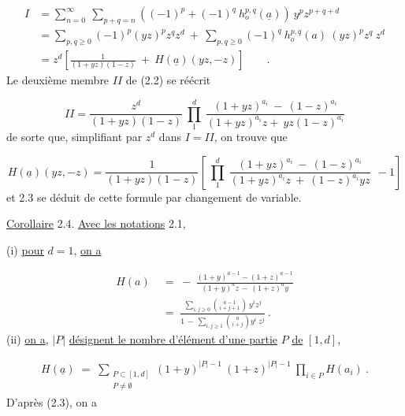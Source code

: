 \begin{equation*}
\begin{aligned}
I &= \sum_{n=0}^{\infty}\ \sum_{p+q=n} ((-1)^p+(-1)^q\ h_o^{p,q}(\underline{a}))\ y^p z^{p+q+d}\\
&= \sum_{p,q\geq 0} (-1)^p(yz)^p z^q z^d\ +\ \sum_{p,q\geq 0} (-1)^q\ h_o^{p,q}(a)\ (yz)^p z^q\ z^d\\
&= z^d\left[\frac{1}{(1+yz)(1-z)}\ +\ H(\underline{a})(yz,-z)\right] \qquad .
\end{aligned}
\end{equation*}
Le deuxième membre $II$ de (2.2) se réécrit

\begin{equation*}
II = \frac{z^d}{(1+yz)(1-z)}\ \prod_{1}^{d}\ \frac{(1+yz)^{a_i}\ -\ (1-z)^{a_i}}{(1+yz)^{a_i}z+\ yz(1-z)^{a_i}}
\end{equation*}
de sorte que, simplifiant par $z^d$ dans $I = II$, on trouve que

\begin{equation*}
H(\underline{a})(yz,-z) = \frac{1}{(1+yz)(1-z)}\left[\ \prod_{1}^{d}\ \frac{(1+yz)^{a_i}\ -\ (1-z)^{a_i}}{(1+yz)^{a_i}z\ +\ (1-z)^{a_i}yz}\ \ -1\right]
\end{equation*}
et 2.3 se déduit de cette formule par changement de variable.



\underline{Corollaire} 2.4. \underline{Avec les notations} 2.1,

(i) \quad \underline{pour} $d = 1$, \underline{on a}

\begin{equation*}
\begin{aligned}
H(a) \;&=\; -\ \frac{(1+y)^{a-1} - (1+z)^{a-1}}{(1+y)^{a}z \,-\, (1+z)^{a}y}\\[2ex]
&=\; \frac{\displaystyle\sum_{i,j\geq 0}\binom{a-1}{i+j+1}\ y^{i}z^{j}}{1 \,-\, \displaystyle\sum_{i,j\geq 1}\binom{a}{i+j}y^{i}\ z^{j}}\ .
\end{aligned}
\end{equation*}
(ii) \quad \underline{on a}, $|P|$ \underline{désignent le nombre d'élément d'une partie} $P$ \underline{de} $[1,d]$,

\begin{multline*}
H(\underline{a}) \;=\; \sum_{\substack{P \subset [1,d] \\ P \neq \emptyset}} (1+y)^{|P|-1}\ (1+z)^{|P|-1}\ \prod_{i \in P} H(a_{i})\ .
\end{multline*}
D'après (2.3), on a

